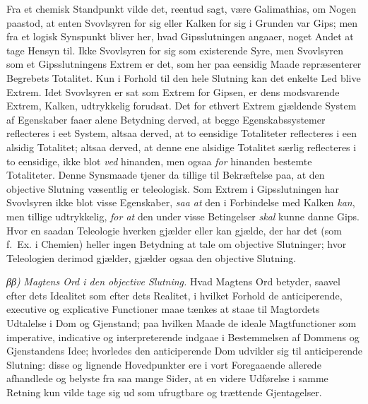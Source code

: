 \documentclass[12pt]{book}
\newcommand{\opage}[1]{\marginnote{\footnotesize\textit{[#1]}}}
\begin{document}
Fra et chemisk Standpunkt vilde det, reentud sagt, være %
Galimathias, om Nogen paastod, at enten Svovlsyren for sig eller Kalken for sig i Grunden var Gips; men fra et logisk Synspunkt bliver her, hvad Gipsslutningen angaaer, noget Andet at tage Hensyn til. Ikke Svovlsyren for sig som existerende Syre, men Svovlsyren som et Gipsslutningens Extrem er det, som her paa eensidig Maade repræsenterer Begrebets Totalitet. Kun i Forhold til den hele Slutning kan det enkelte Led blive Extrem. Idet Svovlsyren er sat som Extrem for Gipsen, er dens modsvarende Extrem, Kalken, udtrykkelig forudsat. Det for ethvert Extrem gjældende System af Egenskaber faaer alene Betydning derved, at begge Egenskabssystemer reflecteres i eet System, altsaa derved, at to eensidige Totaliteter reflecteres i een alsidig Totalitet; altsaa derved, at denne ene alsidige Totalitet særlig reflecteres i to eensidige, ikke blot \emph{ved} hinanden, men ogsaa \emph{for} hinanden bestemte Totaliteter. Denne Synsmaade tjener da tillige til Bekræftelse paa, at den objective Slutning væsentlig er teleologisk. Som Extrem i Gipsslutningen har Svovlsyren ikke blot visse Egenskaber, \emph{saa at} den i Forbindelse med Kalken \emph{kan}, men tillige udtrykkelig, \emph{for at} den under visse Betingelser \emph{skal} kunne danne Gips. Hvor en saadan Teleologie hverken gjælder eller kan gjælde, der har det (som f.~Ex.
\opage{408}i Chemien) heller ingen Betydning at tale om objective Slutninger; hvor Teleologien derimod gjælder, gjælder ogsaa den objective Slutning.

\textit{ββ)} \emph{Magtens Ord i den objective Slutning.} Hvad Magtens Ord betyder, saavel efter dets Idealitet som efter dets Realitet, i hvilket Forhold de anticiperende, executive og explicative Functioner maae tænkes at staae til Magtordets Udtalelse i Dom og Gjenstand; paa hvilken Maade de ideale Magtfunctioner som imperative, indicative og interpreterende indgaae i Bestemmelsen af Dommens og Gjenstandens Idee; hvorledes den anticiperende Dom udvikler sig til anticiperende Slutning: disse og lignende Hovedpunkter ere i vort Foregaaende allerede afhandlede og belyste fra saa mange Sider, at en videre Udførelse i samme Retning kun vilde tage sig ud som ufrugtbare og trættende Gjentagelser.
\end{document}
